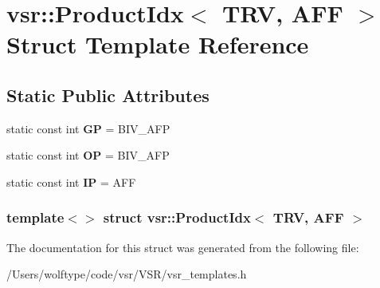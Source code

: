 \hypertarget{structvsr_1_1_product_idx_3_01_t_r_v_00_01_a_f_f_01_4}{\section{vsr\-:\-:Product\-Idx$<$ T\-R\-V, A\-F\-F $>$ Struct Template Reference}
\label{structvsr_1_1_product_idx_3_01_t_r_v_00_01_a_f_f_01_4}
}
\subsection*{Static Public Attributes}
\begin{DoxyCompactItemize}
\item 
\hypertarget{structvsr_1_1_product_idx_3_01_t_r_v_00_01_a_f_f_01_4_afbcbb6eb1ad3a379f0b924d62828480f}{static const int {\bfseries G\-P} = B\-I\-V\-\_\-\-A\-F\-P}\label{structvsr_1_1_product_idx_3_01_t_r_v_00_01_a_f_f_01_4_afbcbb6eb1ad3a379f0b924d62828480f}

\item 
\hypertarget{structvsr_1_1_product_idx_3_01_t_r_v_00_01_a_f_f_01_4_aa53c2ab4bd5ddd19e78fdd1e6468846e}{static const int {\bfseries O\-P} = B\-I\-V\-\_\-\-A\-F\-P}\label{structvsr_1_1_product_idx_3_01_t_r_v_00_01_a_f_f_01_4_aa53c2ab4bd5ddd19e78fdd1e6468846e}

\item 
\hypertarget{structvsr_1_1_product_idx_3_01_t_r_v_00_01_a_f_f_01_4_ab5aa0440d7988457cadf585b2393da27}{static const int {\bfseries I\-P} = A\-F\-F}\label{structvsr_1_1_product_idx_3_01_t_r_v_00_01_a_f_f_01_4_ab5aa0440d7988457cadf585b2393da27}

\end{DoxyCompactItemize}
\subsubsection*{template$<$$>$ struct vsr\-::\-Product\-Idx$<$ T\-R\-V, A\-F\-F $>$}



The documentation for this struct was generated from the following file\-:\begin{DoxyCompactItemize}
\item 
/\-Users/wolftype/code/vsr/\-V\-S\-R/vsr\-\_\-templates.\-h\end{DoxyCompactItemize}
